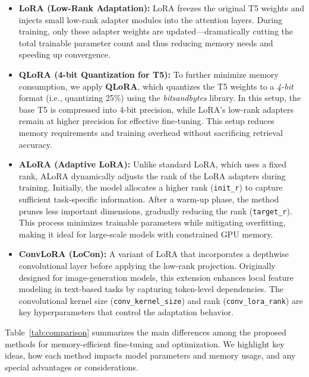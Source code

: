 \begin{itemize}
    \item \textbf{LoRA (Low-Rank Adaptation):} LoRA freezes the original T5 weights and injects small low-rank adapter modules into the attention layers. During training, only these adapter weights are updated—dramatically cutting the total trainable parameter count and thus reducing memory needs and speeding up convergence.

    \item \textbf{QLoRA (4-bit Quantization for T5):} To further minimize memory consumption, we apply \textbf{QLoRA}, which quantizes the T5 weights to a \emph{4-bit} format (i.e., quantizing 25\%) using the \textit{bitsandbytes} library. In this setup, the base T5 is compressed into 4-bit precision, while LoRA’s low-rank adapters remain at higher precision for effective fine-tuning. This setup reduces memory requirements and training overhead without sacrificing retrieval accuracy.

    \item \textbf{ALoRA (Adaptive LoRA):} Unlike standard LoRA, which uses a fixed rank, ALoRA dynamically adjusts the rank of the LoRA adapters during training. Initially, the model allocates a higher rank (\texttt{init\_r}) to capture sufficient task-specific information. After a warm-up phase, the method prunes less important dimensions, gradually reducing the rank (\texttt{target\_r}). This process minimizes trainable parameters while mitigating overfitting, making it ideal for large-scale models with constrained GPU memory.

    \item \textbf{ConvLoRA (LoCon):} A variant of LoRA that incorporates a depthwise convolutional layer before applying the low-rank projection. Originally designed for image-generation models, this extension enhances local feature modeling in text-based tasks by capturing token-level dependencies. The convolutional kernel size (\texttt{conv\_kernel\_size}) and rank (\texttt{conv\_lora\_rank}) are key hyperparameters that control the adaptation behavior.
\end{itemize}

Table~\ref{tab:comparison} summarizes the main differences among the proposed methods for memory-efficient fine-tuning and optimization. We highlight key ideas, how each method impacts model parameters and memory usage, and any special advantages or considerations.


